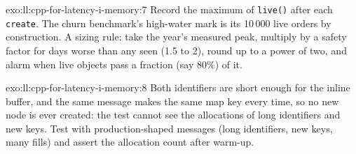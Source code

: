 \begin{solution}{exo:ll:cpp-for-latency-i-memory:7}
Record the maximum of \texttt{live()} after each \texttt{create}. The churn benchmark's high-water mark is its 10\,000
live orders by construction. A sizing rule: take the year's measured peak, multiply by a safety factor for days worse
than any seen (1.5 to 2), round up to a power of two, and alarm when live objects pass a fraction (say 80\%) of it.
\end{solution}

\begin{solution}{exo:ll:cpp-for-latency-i-memory:8}
Both identifiers are short enough for the inline buffer, and the same message makes the same map key every time, so no new
node is ever created: the test cannot see the allocations of long identifiers and new keys. Test with production-shaped
messages (long identifiers, new keys, many fills) and assert the allocation count after warm-up.
\end{solution}

